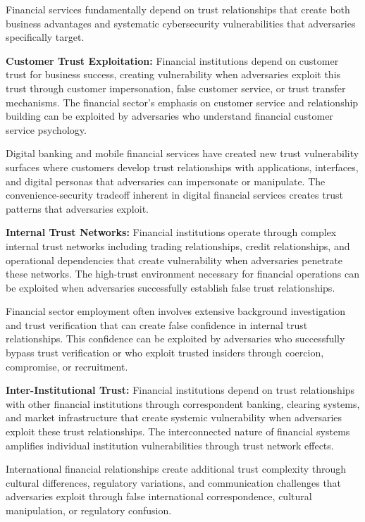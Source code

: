 \documentclass[10pt, twocolumn]{article}
\begin{document}
Financial services fundamentally depend on trust relationships that create both business advantages and systematic cybersecurity vulnerabilities that adversaries specifically target.

\textbf{Customer Trust Exploitation:} Financial institutions depend on customer trust for business success, creating vulnerability when adversaries exploit this trust through customer impersonation, false customer service, or trust transfer mechanisms. The financial sector's emphasis on customer service and relationship building can be exploited by adversaries who understand financial customer service psychology.

Digital banking and mobile financial services have created new trust vulnerability surfaces where customers develop trust relationships with applications, interfaces, and digital personas that adversaries can impersonate or manipulate. The convenience-security tradeoff inherent in digital financial services creates trust patterns that adversaries exploit.

\textbf{Internal Trust Networks:} Financial institutions operate through complex internal trust networks including trading relationships, credit relationships, and operational dependencies that create vulnerability when adversaries penetrate these networks. The high-trust environment necessary for financial operations can be exploited when adversaries successfully establish false trust relationships.

Financial sector employment often involves extensive background investigation and trust verification that can create false confidence in internal trust relationships. This confidence can be exploited by adversaries who successfully bypass trust verification or who exploit trusted insiders through coercion, compromise, or recruitment.

\textbf{Inter-Institutional Trust:} Financial institutions depend on trust relationships with other financial institutions through correspondent banking, clearing systems, and market infrastructure that create systemic vulnerability when adversaries exploit these trust relationships. The interconnected nature of financial systems amplifies individual institution vulnerabilities through trust network effects.

International financial relationships create additional trust complexity through cultural differences, regulatory variations, and communication challenges that adversaries exploit through false international correspondence, cultural manipulation, or regulatory confusion.
\end{document}
